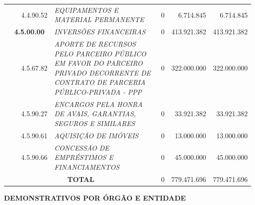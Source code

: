 \documentclass{article}
\begin{document}
\begin{longtable}[c]{m{0.1cm}m{0.1cm}m{0.8cm}|m{8cm}|m{2cm}|m{2cm}|m{2cm}}
\multicolumn{1}{l}{} & \multicolumn{1}{l}{} & \multicolumn{1}{l|}{4.4.90.52} & \multicolumn{1}{L{8cm}|}{\textit{EQUIPAMENTOS E MATERIAL PERMANENTE}} & \multicolumn{1}{r|}{0} & \multicolumn{1}{r|}{6.714.845} &  \multicolumn{1}{r}{6.714.845}\\
\multicolumn{1}{l}{} & \multicolumn{2}{l|}{\textbf{4.5.00.00}} & \multicolumn{1}{L{8cm}|}{\textit{INVERSÕES FINANCEIRAS}} & \multicolumn{1}{r|}{0} & \multicolumn{1}{r|}{413.921.382} &  \multicolumn{1}{r}{413.921.382}\\
\multicolumn{1}{l}{} & \multicolumn{1}{l}{} & \multicolumn{1}{l|}{4.5.67.82} & \multicolumn{1}{L{8cm}|}{\textit{APORTE DE RECURSOS PELO PARCEIRO PÚBLICO EM FAVOR DO PARCEIRO PRIVADO DECORRENTE DE CONTRATO DE PARCERIA PÚBLICO-PRIVADA - PPP}} & \multicolumn{1}{r|}{0} & \multicolumn{1}{r|}{322.000.000} &  \multicolumn{1}{r}{322.000.000}\\
\multicolumn{1}{l}{} & \multicolumn{1}{l}{} & \multicolumn{1}{l|}{4.5.90.27} & \multicolumn{1}{L{8cm}|}{\textit{ENCARGOS PELA HONRA DE AVAIS, GARANTIAS, SEGUROS E SIMILARES}} & \multicolumn{1}{r|}{0} & \multicolumn{1}{r|}{33.921.382} &  \multicolumn{1}{r}{33.921.382}\\
\multicolumn{1}{l}{} & \multicolumn{1}{l}{} & \multicolumn{1}{l|}{4.5.90.61} & \multicolumn{1}{L{8cm}|}{\textit{AQUISIÇÃO DE IMÓVEIS}} & \multicolumn{1}{r|}{0} & \multicolumn{1}{r|}{13.000.000} &  \multicolumn{1}{r}{13.000.000}\\
\multicolumn{1}{l}{} & \multicolumn{1}{l}{} & \multicolumn{1}{l|}{4.5.90.66} & \multicolumn{1}{L{8cm}|}{\textit{CONCESSÃO DE EMPRÉSTIMOS E FINANCIAMENTOS}} & \multicolumn{1}{r|}{0} & \multicolumn{1}{r|}{45.000.000} &  \multicolumn{1}{r}{45.000.000}\\
\hline
\multicolumn{4}{c|}{\textbf{TOTAL}} & \multicolumn{1}{r|}{0} & \multicolumn{1}{r|}{779.471.696} &  \multicolumn{1}{r}{779.471.696}
\end{longtable}
\newpage
\ifthispageodd{ }{\afterpage{\null\thispagestyle{empty}\newpage}}

\restoregeometry
\vspace*{9cm}
\centering \Huge {\textbf{DEMONSTRATIVOS POR ÓRGÃO E ENTIDADE}}
\afterpage{\null\thispagestyle{empty}\newpage}
\newpage
{}

\end{document}
